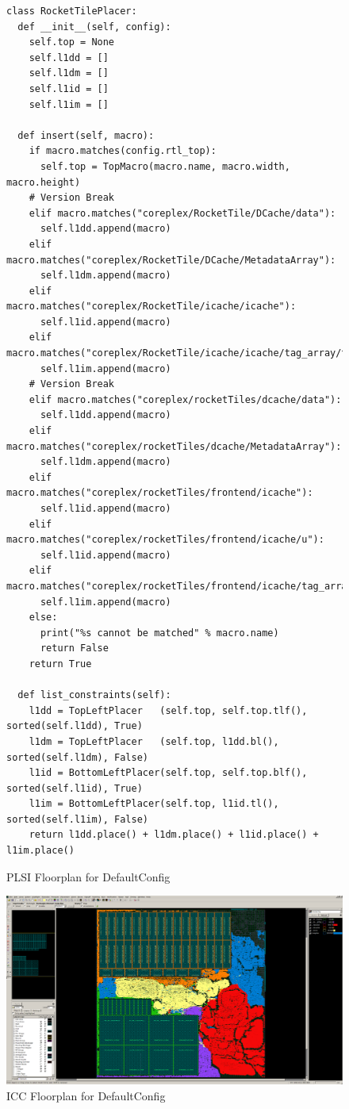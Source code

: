 \documentclass{article}
\begin{document}
\begin{figure}
\tiny
\begin{verbatim}
class RocketTilePlacer:
  def __init__(self, config):
    self.top = None
    self.l1dd = []
    self.l1dm = []
    self.l1id = []
    self.l1im = []

  def insert(self, macro):
    if macro.matches(config.rtl_top):
      self.top = TopMacro(macro.name, macro.width, macro.height)
    # Version Break
    elif macro.matches("coreplex/RocketTile/DCache/data"):
      self.l1dd.append(macro)
    elif macro.matches("coreplex/RocketTile/DCache/MetadataArray"):
      self.l1dm.append(macro)
    elif macro.matches("coreplex/RocketTile/icache/icache"):
      self.l1id.append(macro)
    elif macro.matches("coreplex/RocketTile/icache/icache/tag_array/tag_array"):
      self.l1im.append(macro)
    # Version Break
    elif macro.matches("coreplex/rocketTiles/dcache/data"):
      self.l1dd.append(macro)
    elif macro.matches("coreplex/rocketTiles/dcache/MetadataArray"):
      self.l1dm.append(macro)
    elif macro.matches("coreplex/rocketTiles/frontend/icache"):
      self.l1id.append(macro)
    elif macro.matches("coreplex/rocketTiles/frontend/icache/u"):
      self.l1id.append(macro)
    elif macro.matches("coreplex/rocketTiles/frontend/icache/tag_array/tag_array"):
      self.l1im.append(macro)
    else:
      print("%s cannot be matched" % macro.name)
      return False
    return True

  def list_constraints(self):
    l1dd = TopLeftPlacer   (self.top, self.top.tlf(), sorted(self.l1dd), True)
    l1dm = TopLeftPlacer   (self.top, l1dd.bl(),      sorted(self.l1dm), False)
    l1id = BottomLeftPlacer(self.top, self.top.blf(), sorted(self.l1id), True)
    l1im = BottomLeftPlacer(self.top, l1id.tl(),      sorted(self.l1im), False)
    return l1dd.place() + l1dm.place() + l1id.place() + l1im.place()
\end{verbatim}
  \caption{PLSI Floorplan for DefaultConfig}
  \label{res:rocket-fppy}
\end{figure}

\begin{figure}
  \begin{center}
    \includegraphics[width=0.95\linewidth]{figures/icc-rocket.png}
  \end{center}
  \caption{ICC Floorplan for DefaultConfig}
  \label{res:rocket-icc}
\end{figure}
\end{document}
